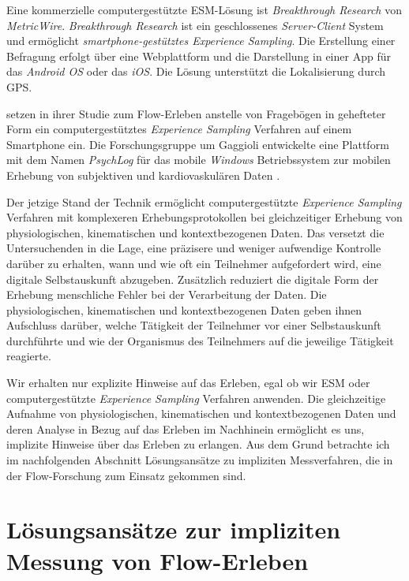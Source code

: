 Eine kommerzielle computergestützte \ac{ESM}-Lösung ist \emph{Breakthrough Research} von \emph{MetricWire}. \emph{Breakthrough Research} ist ein geschlossenes \emph{Server-Client} System und ermöglicht \emph{smartphone-gestütztes Experience Sampling}. Die Erstellung einer Befragung erfolgt über eine Webplattform und die Darstellung in einer App für das \emph{Android OS} oder das \emph{iOS}. Die Lösung unterstützt die Lokalisierung durch \ac{GPS}.

\citet{Gaggioli2013} setzen in ihrer Studie zum Flow-Erleben anstelle von Fragebögen in gehefteter Form ein computergestütztes \emph{Experience Sampling} Verfahren auf einem Smartphone ein. Die Forschungsgruppe um Gaggioli entwickelte eine Plattform mit dem Namen \emph{PsychLog} für das mobile \emph{Windows} Betriebssystem zur mobilen Erhebung von subjektiven und kardiovaskulären Daten \citep{Gaggioli2013a}.

Der jetzige Stand der Technik ermöglicht computergestützte \emph{Experience Sampling} Verfahren mit komplexeren Erhebungsprotokollen bei gleichzeitiger Erhebung von physiologischen, kinematischen und kontextbezogenen Daten. Das versetzt die Untersuchenden in die Lage, eine präzisere und weniger aufwendige Kontrolle darüber zu erhalten, wann und wie oft ein Teilnehmer aufgefordert wird, eine digitale Selbstauskunft abzugeben. Zusätzlich reduziert die digitale Form der Erhebung menschliche Fehler bei der Verarbeitung der Daten. Die physiologischen, kinematischen und kontextbezogenen Daten geben ihnen Aufschluss darüber, welche Tätigkeit der Teilnehmer vor einer Selbstauskunft durchführte und wie der Organismus des Teilnehmers auf die jeweilige Tätigkeit reagierte.

Wir erhalten nur explizite Hinweise auf das Erleben, egal ob wir \ac{ESM} oder computergestützte \emph{Experience Sampling} Verfahren anwenden. Die gleichzeitige Aufnahme von physiologischen, kinematischen und kontextbezogenen Daten und deren Analyse in Bezug auf das Erleben im Nachhinein ermöglicht es uns, implizite Hinweise über das Erleben zu erlangen. Aus dem Grund betrachte ich im nachfolgenden Abschnitt Lösungsansätze zu impliziten Messverfahren, die in der Flow-Forschung zum Einsatz gekommen sind.

\section{Lösungsansätze zur impliziten Messung von Flow-Erleben}
\label{sec:loesungsansaetze_zur_impliziten_messung_von_flow_erleben}

